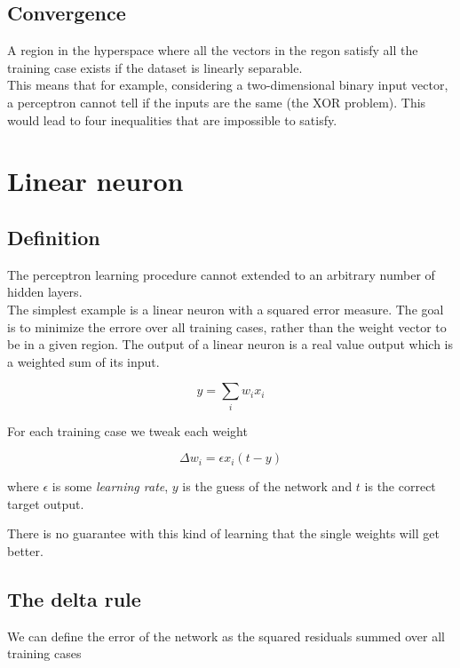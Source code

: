 \documentclass[a4paper]{article}
\begin{document}

\subsection{Convergence}

A region in the hyperspace where all the vectors in the regon satisfy all the training case exists if the dataset is linearly separable.
\\
This means that for example, considering a two-dimensional binary input vector, a perceptron cannot tell if the inputs are the same
(the XOR problem). This would lead to four inequalities that are impossible to satisfy.

\pagebreak


\section{Linear neuron}

\subsection{Definition}

The perceptron learning procedure cannot extended to an arbitrary number of hidden layers. \\

The simplest example is a linear neuron with a squared error measure.
The goal is to minimize the errore over all training cases, rather than the weight vector to be in a given region.
The output of a linear neuron is a real value output which is a weighted sum of its input.

\[
    y=\sum_i w_i x_i
\]

For each training case we tweak each weight

\[
    \Delta w_i=\epsilon x_i(t-y)
\]

where \(\epsilon\) is some \textit{learning rate}, \(y\) is the guess of the network and \(t\) is the correct target output.

There is no guarantee with this kind of learning that the single weights will get better.

\subsection{The delta rule}

We can define the error of the network as the squared residuals summed over all training cases
\end{document}
